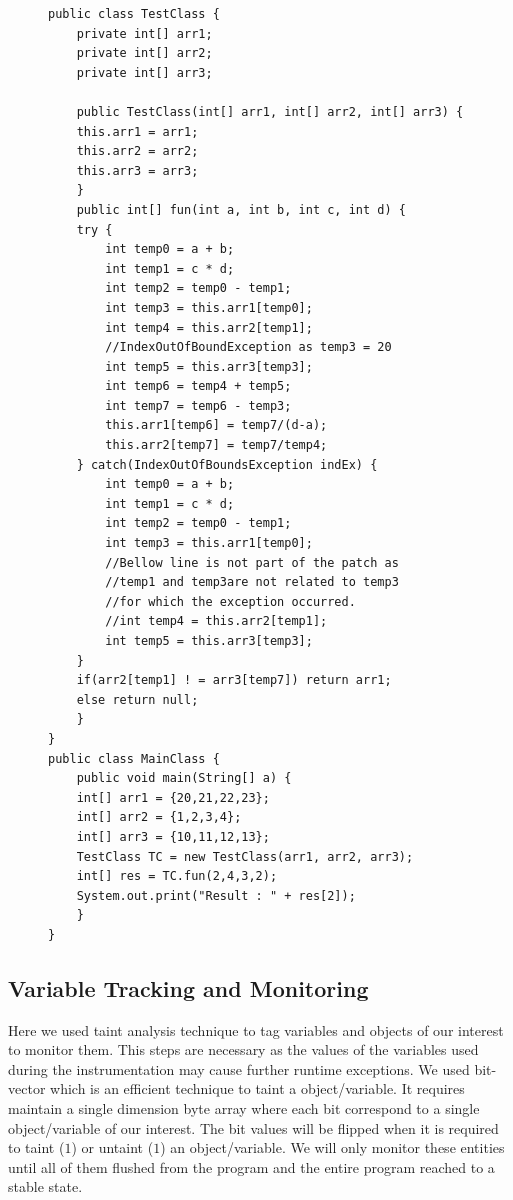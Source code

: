  

\lstset{language=Java, caption=patching code slice based on exception type,
label=patchingexample1}

\begin{figure}[t]
\begin{lstlisting}[countblanklines=false]
public class TestClass {
    private int[] arr1;
    private int[] arr2;
    private int[] arr3;

    public TestClass(int[] arr1, int[] arr2, int[] arr3) {
	this.arr1 = arr1;
	this.arr2 = arr2;
	this.arr3 = arr3;
    }
    public int[] fun(int a, int b, int c, int d) {
	try {
	    int temp0 = a + b;
	    int temp1 = c * d;
	    int temp2 = temp0 - temp1;
	    int temp3 = this.arr1[temp0];
	    int temp4 = this.arr2[temp1];
	    //IndexOutOfBoundException as temp3 = 20
	    int temp5 = this.arr3[temp3];
	    int temp6 = temp4 + temp5;
	    int temp7 = temp6 - temp3;
	    this.arr1[temp6] = temp7/(d-a);
	    this.arr2[temp7] = temp7/temp4;
	} catch(IndexOutOfBoundsException indEx) {
	    int temp0 = a + b;
	    int temp1 = c * d;
	    int temp2 = temp0 - temp1;
	    int temp3 = this.arr1[temp0];
	    //Bellow line is not part of the patch as
	    //temp1 and temp3are not related to temp3
	    //for which the exception occurred.
	    //int temp4 = this.arr2[temp1];
	    int temp5 = this.arr3[temp3];
	}
	if(arr2[temp1] ! = arr3[temp7]) return arr1;
	else return null;
    }
}
public class MainClass {
    public void main(String[] a) {
	int[] arr1 = {20,21,22,23};
	int[] arr2 = {1,2,3,4};
	int[] arr3 = {10,11,12,13};
	TestClass TC = new TestClass(arr1, arr2, arr3);
	int[] res = TC.fun(2,4,3,2);
	System.out.print("Result : " + res[2]);
    }    
}
\end{lstlisting}
\end{figure}

\subsection{Variable Tracking and Monitoring}
\label{subsec:taint}


Here we used taint analysis technique to tag variables and objects of our
interest to monitor them.
This steps are necessary as the values of the variables used during the
instrumentation may cause further runtime exceptions.
We used bit-vector which is an efficient technique to taint a object/variable.
It requires maintain a single dimension byte array where each bit correspond to
a single object/variable of our interest.
The bit values will be flipped when it is required to taint ($1$) or untaint
($1$) an object/variable.
We will only monitor these entities until all of them flushed from the program
and the entire program reached to a stable state.